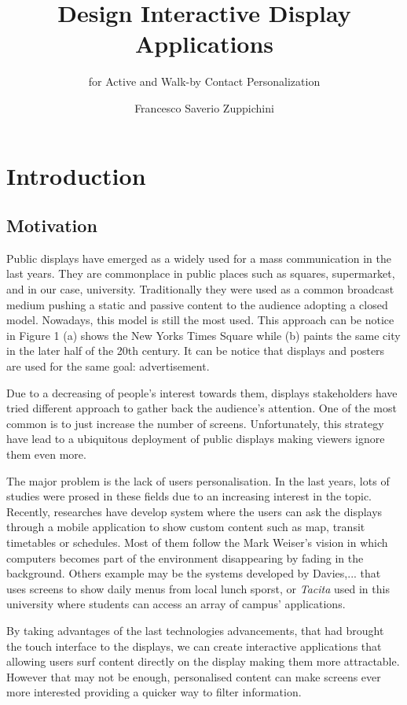 \documentclass[]{usiinfbachelorproject}
\author{Francesco Saverio Zuppichini}
\title{Design Interactive Display Applications}
\subtitle{for Active and Walk-by Contact Personalization}
\begin{document}
\maketitle

\section{Introduction}
\subsection{Motivation}

Public displays have emerged as a widely used for a mass communication in the last years. They are commonplace in public places such as squares, supermarket, and in our case, university. 
Traditionally they were used as a common broadcast medium pushing a static and passive content to the audience adopting a closed model. Nowadays, this model is still the most used. This approach can be notice in Figure 1 (a) shows the New Yorks Times Square while (b) paints the same city in the later half of the 20th century. It can be notice that displays and posters are used for the same goal: advertisement.

Due to a decreasing of people's interest towards them, displays stakeholders have tried different approach to gather back the audience's attention. One of the most common is to just increase the number of screens. Unfortunately, this strategy have lead to a ubiquitous deployment of public displays making viewers ignore them even more.

The major problem is the lack of users personalisation. In the last years, lots of studies were prosed in these fields due to an increasing interest in the topic. Recently, researches have develop system where the users can ask the displays through a mobile application to show custom content such as map, transit timetables or schedules. Most of them follow the Mark Weiser's vision in which computers becomes part of the environment disappearing by fading in the background.
Others example may be the systems developed by Davies,... that uses screens to show daily menus from local lunch sporst, or \emph{Tacita} used in this university where students can access an array of campus' applications.

By taking advantages of the last technologies advancements, that had brought the touch interface to the displays, we can create interactive applications that allowing users surf content directly on the display making them more attractable. However that may not be enough, personalised content can make screens ever more interested providing a quicker way to filter information. 
\end{document}

